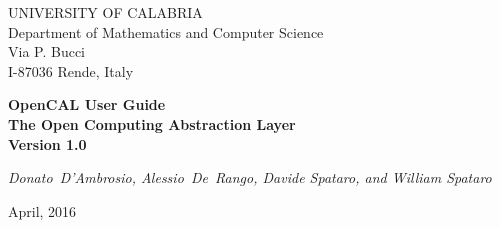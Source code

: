 \thispagestyle{empty}

\newcommand{\HS}[1][1.]{\hspace{\stretch{#1}}}
\begin{center}


\huge{UNIVERSITY OF CALABRIA}\\
\vspace*{0.25cm}
\large{Department of Mathematics and Computer Science}\\
\normalsize{Via P. Bucci\\
I-87036 Rende, Italy\\
\vspace*{0.25cm} \HS \hrulefill \HS}



\vspace*{3.5cm}

\Huge{\textbf{OpenCAL User Guide}}\\
\vspace*{0.2cm}
\large{\textbf{The Open Computing Abstraction Layer}}\\
\vspace*{0.7cm}
\Large{\textbf{Version 1.0}}
\vspace*{1cm}


\vspace*{1cm}

\normalsize{\textit{Donato~D'Ambrosio, Alessio~De~Rango, Davide Spataro, and William Spataro}}

\vspace*{3.5cm}

\normalsize{April, 2016}

\vspace*{2.0cm}



\end{center}
